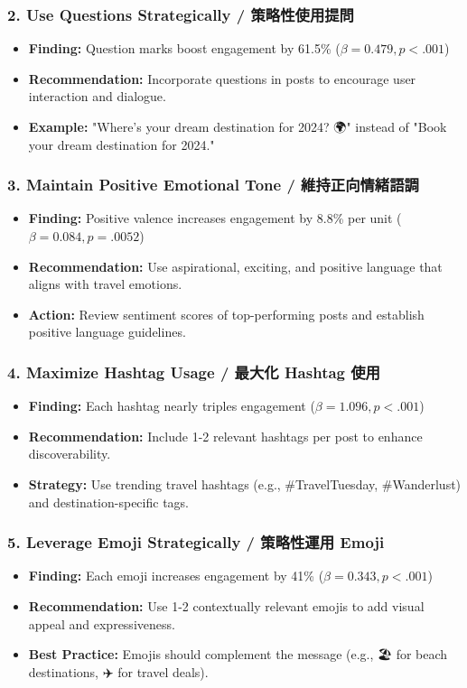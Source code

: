 \documentclass[12pt,a4paper,fontset=none]{ctexart}
\begin{document}
\subsubsection{2. Use Questions Strategically / 策略性使用提問}
\begin{itemize}
    \item \textbf{Finding:} Question marks boost engagement by 61.5\% ($\beta = 0.479, p < .001$)
    \item \textbf{Recommendation:} Incorporate questions in posts to encourage user interaction and dialogue.
    \item \textbf{Example:} "Where's your dream destination for 2024? 🌍" instead of "Book your dream destination for 2024."
\end{itemize}

\subsubsection{3. Maintain Positive Emotional Tone / 維持正向情緒語調}
\begin{itemize}
    \item \textbf{Finding:} Positive valence increases engagement by 8.8\% per unit ($\beta = 0.084, p = .0052$)
    \item \textbf{Recommendation:} Use aspirational, exciting, and positive language that aligns with travel emotions.
    \item \textbf{Action:} Review sentiment scores of top-performing posts and establish positive language guidelines.
\end{itemize}

\subsubsection{4. Maximize Hashtag Usage / 最大化 Hashtag 使用}
\begin{itemize}
    \item \textbf{Finding:} Each hashtag nearly triples engagement ($\beta = 1.096, p < .001$)
    \item \textbf{Recommendation:} Include 1-2 relevant hashtags per post to enhance discoverability.
    \item \textbf{Strategy:} Use trending travel hashtags (e.g., \#TravelTuesday, \#Wanderlust) and destination-specific tags.
\end{itemize}

\subsubsection{5. Leverage Emoji Strategically / 策略性運用 Emoji}
\begin{itemize}
    \item \textbf{Finding:} Each emoji increases engagement by 41\% ($\beta = 0.343, p < .001$)
    \item \textbf{Recommendation:} Use 1-2 contextually relevant emojis to add visual appeal and expressiveness.
    \item \textbf{Best Practice:} Emojis should complement the message (e.g., 🏖️ for beach destinations, ✈️ for travel deals).
\end{itemize}
\end{document}
